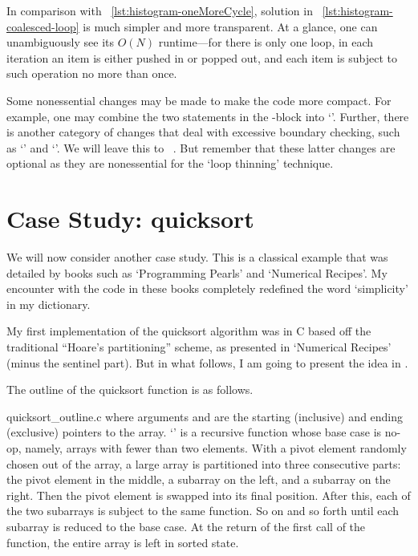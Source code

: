 In comparison with ~\autoref{lst:histogram-oneMoreCycle}, solution in
~\autoref{lst:histogram-coalesced-loop} is much simpler and more transparent.
At a glance, one can unambiguously see its $O(N)$ runtime---for there is only one loop,
in each iteration an item is either pushed in or popped out,
and each item is subject to such operation no more than once.


Some nonessential changes may be made to make the code more compact.
For example, one may combine the two statements in the -block into
`'.
Further, there is another category of changes that deal with excessive boundary checking,
such as
`' and `'.
We will leave this to ~.
But remember that these latter changes are optional
as they are nonessential for the `loop thinning' technique.


\section{Case Study: quicksort}\label{sec:nested-loop-quick-sort}

We will now consider another case study.
This is a classical example that was detailed by books such as `Programming
Pearls' and `Numerical Recipes'\cite{Bentley:1986:PP, NumericalRecipes:1992}.
My encounter with the code in these books completely redefined the word `simplicity'
in my dictionary.


My first implementation of the quicksort algorithm was in C based off
the traditional ``Hoare's partitioning'' scheme, as presented
in `Numerical Recipes' (minus the sentinel part).
But in what follows, I am going to present the idea in \python.


The outline of the quicksort function is as follows.

{quicksort_outline.c}
where arguments  and  are the starting (inclusive) and ending (exclusive) pointers
to the array.
`' is a recursive function whose base case is no-op, namely,
arrays with fewer than two elements.
With a pivot element randomly chosen out of the array,
a large array is partitioned into three consecutive parts: the pivot element in the middle, a
subarray on the left, and a subarray on the right.
Then the pivot element is swapped into its final position.
After this, each of the two subarrays is subject to the same function.
So on and so forth until each subarray is reduced to the base case.
At the return of the first call of the function, the entire array is left in sorted state.



